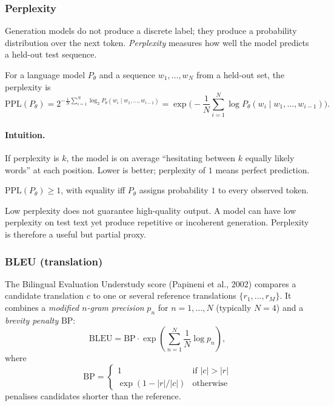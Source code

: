 \subsubsection*{Perplexity}

Generation models do not produce a discrete label; they produce a probability distribution over the next token. \emph{Perplexity} measures how well the model predicts a held-out test sequence.

\begin{definition}[Perplexity]
For a language model $P_\theta$ and a sequence $w_1, \dots, w_N$ from a held-out set, the perplexity is
\[ \mathrm{PPL}(P_\theta) = 2^{-\frac{1}{N} \sum_{i=1}^{N} \log_2 P_\theta(w_i \mid w_1, \dots, w_{i-1})} = \exp\Big(- \frac{1}{N} \sum_{i=1}^{N} \log P_\theta(w_i \mid w_1, \dots, w_{i-1})\Big). \]
\end{definition}

\paragraph{Intuition.} If perplexity is $k$, the model is on average ``hesitating between $k$ equally likely words'' at each position. Lower is better; perplexity of $1$ means perfect prediction.

\begin{property}
$\mathrm{PPL}(P_\theta) \ge 1$, with equality iff $P_\theta$ assigns probability $1$ to every observed token.
\end{property}

\begin{remark}[A caveat]
Low perplexity does not guarantee high-quality output. A model can have low perplexity on test text yet produce repetitive or incoherent generation. Perplexity is therefore a useful but partial proxy.
\end{remark}

\subsubsection*{BLEU (translation)}

\begin{definition}
The Bilingual Evaluation Understudy score (Papineni et al., 2002) compares a candidate translation $c$ to one or several reference translations $\{r_1, \dots, r_M\}$. It combines a \emph{modified $n$-gram precision} $p_n$ for $n = 1, \dots, N$ (typically $N = 4$) and a \emph{brevity penalty} $\mathrm{BP}$:
\[ \mathrm{BLEU} = \mathrm{BP} \cdot \exp\!\left( \sum_{n=1}^{N} \frac{1}{N} \log p_n \right), \]
where
\[ \mathrm{BP} = \begin{cases} 1 & \text{if } |c| > |r| \\ \exp(1 - |r| / |c|) & \text{otherwise} \end{cases} \]
penalises candidates shorter than the reference.
\end{definition}

